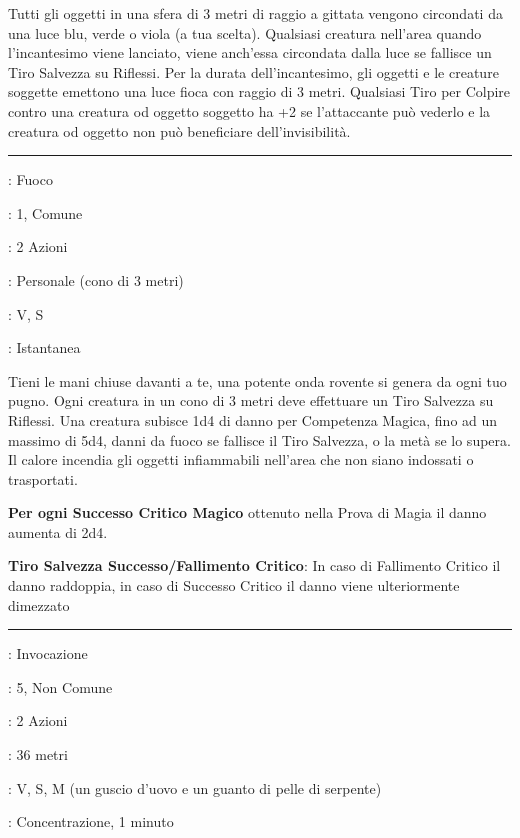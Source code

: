 \begin{multicols}{2}
Tutti gli oggetti in una sfera di 3 metri di raggio a gittata vengono circondati da una luce blu, verde o viola (a tua scelta). Qualsiasi creatura nell'area quando l'incantesimo viene lanciato, viene anch'essa circondata dalla luce se fallisce un Tiro Salvezza su Riflessi. Per la durata dell'incantesimo, gli oggetti e le creature soggette emettono una luce fioca con raggio di 3 metri. Qualsiasi Tiro per Colpire contro una creatura od oggetto soggetto ha +2 se l'attaccante può vederlo e la creatura od oggetto non può beneficiare dell'invisibilità.

\smallskip\noindent\rule{\linewidth}{2pt} \hypertarget{Onda rovente}{}\smallskip{}
\noindent
\begin{description}[noitemsep, topsep=0pt, parsep=0pt, partopsep=0pt, leftmargin=0cm, labelwidth=2.8cm]
	\item[\textbf{Lista di Magia}]: Fuoco
	\item[\textbf{Livello}]: 1, Comune
	\item[\textbf{T. di Lancio}]: 2 Azioni
	\item[\textbf{Gittata}]: Personale (cono di 3 metri)
	\item[\textbf{Componenti}]: V, S
	\item[\textbf{Durata}]: Istantanea
\end{description}

Tieni le mani chiuse davanti a te, una potente onda rovente si genera da ogni tuo pugno. Ogni creatura in un cono di 3 metri deve effettuare un Tiro Salvezza su Riflessi. Una creatura subisce 1d4 di danno per Competenza Magica, fino ad un massimo di 5d4, danni da fuoco se fallisce il Tiro Salvezza, o la metà se lo supera. Il calore incendia gli oggetti infiammabili nell'area che non siano indossati o trasportati.

\textbf{Per ogni Successo Critico Magico} ottenuto nella Prova di Magia il danno aumenta di 2d4.

\textbf{Tiro Salvezza Successo/Fallimento Critico}: In caso di Fallimento Critico il danno raddoppia, in caso di Successo Critico il danno viene ulteriormente dimezzato

\smallskip\noindent\rule{\linewidth}{2pt} \hypertarget{Mano Arcana}{}\smallskip{}
\noindent
\begin{description}[noitemsep, topsep=0pt, parsep=0pt, partopsep=0pt, leftmargin=0cm, labelwidth=2.8cm]
	\item[\textbf{Lista di Magia}]: Invocazione
	\item[\textbf{Livello}]: 5, Non Comune
	\item[\textbf{T. di Lancio}]: 2 Azioni
	\item[\textbf{Gittata}]: 36 metri
	\item[\textbf{Componenti}]: V, S, M (un guscio d'uovo e un guanto di pelle di serpente)
	\item[\textbf{Durata}]: Concentrazione, 1 minuto
\end{description}


\end{multicols}
